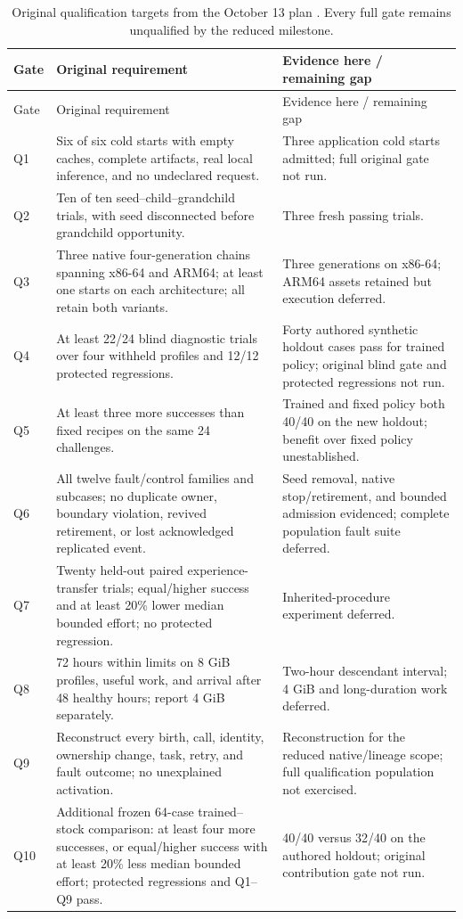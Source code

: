 \documentclass[11pt,letterpaper]{article}
\begin{document}
\small
\begin{longtable}{@{}p{}p{}p{}@{}}
\caption{Original qualification targets from the October 13 plan
\cite{original}. Every full gate remains unqualified by the reduced milestone.}\\
\toprule
Gate & Original requirement & Evidence here / remaining gap\\
\midrule\endfirsthead
\toprule Gate & Original requirement & Evidence here / remaining gap\\\midrule\endhead
Q1 & Six of six cold starts with empty caches, complete artifacts, real local
inference, and no undeclared request. &
Three application cold starts admitted; full original gate not run.\\
Q2 & Ten of ten seed--child--grandchild trials, with seed disconnected before
grandchild opportunity. & Three fresh passing trials.\\
Q3 & Three native four-generation chains spanning x86-64 and ARM64; at least one
starts on each architecture; all retain both variants. &
Three generations on x86-64; ARM64 assets retained but execution deferred.\\
Q4 & At least 22/24 blind diagnostic trials over four withheld profiles and
12/12 protected regressions. & Forty authored synthetic holdout cases pass for
trained policy; original blind gate and protected regressions not run.\\
Q5 & At least three more successes than fixed recipes on the same 24 challenges. &
Trained and fixed policy both 40/40 on the new holdout; benefit over fixed policy
unestablished.\\
Q6 & All twelve fault/control families and subcases; no duplicate owner,
boundary violation, revived retirement, or lost acknowledged replicated event. &
Seed removal, native stop/retirement, and bounded admission evidenced;
complete population fault suite deferred.\\
Q7 & Twenty held-out paired experience-transfer trials; equal/higher success
and at least 20\% lower median bounded effort; no protected regression. &
Inherited-procedure experiment deferred.\\
Q8 & 72 hours within limits on 8 GiB profiles, useful work, and arrival after
48 healthy hours; report 4 GiB separately. &
Two-hour descendant interval; 4 GiB and long-duration work deferred.\\
Q9 & Reconstruct every birth, call, identity, ownership change, task, retry,
and fault outcome; no unexplained activation. &
Reconstruction for the reduced native/lineage scope; full qualification
population not exercised.\\
Q10 & Additional frozen 64-case trained--stock comparison: at least four more
successes, or equal/higher success with at least 20\% less median bounded
effort; protected regressions and Q1--Q9 pass. &
40/40 versus 32/40 on the authored holdout; original contribution gate
not run.\\
\bottomrule
\end{longtable}
\normalsize
\end{document}
